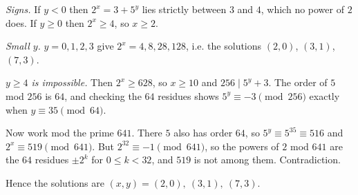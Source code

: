 \emph{Signs.} If $y<0$ then $2^x=3+5^y$ lies strictly between $3$ and $4$, which no power of $2$ does. If $y\ge0$ then $2^x\ge4$, so $x\ge2$.

\emph{Small $y$.} $y=0,1,2,3$ give $2^x=4,8,28,128$, i.e. the solutions $(2,0)$, $(3,1)$, $(7,3)$.

\emph{$y\ge4$ is impossible.} Then $2^x\ge628$, so $x\ge10$ and $256\mid5^y+3$. The order of $5$ mod $256$ is $64$, and checking the $64$ residues shows $5^y\equiv-3\pmod{256}$ exactly when $y\equiv35\pmod{64}$.

Now work mod the prime $641$. There $5$ also has order $64$, so $5^y\equiv5^{35}\equiv516$ and $2^x\equiv519\pmod{641}$. But $2^{32}\equiv-1\pmod{641}$, so the powers of $2$ mod $641$ are the $64$ residues $\pm2^k$ for $0\le k<32$, and $519$ is not among them. Contradiction.

Hence the solutions are $\boxed{(x,y)=(2,0),\ (3,1),\ (7,3)}$.
